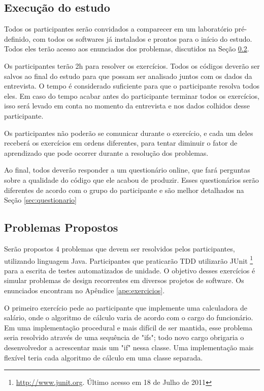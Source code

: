 \subsection{Execução do estudo}
\label{sec:execucao}	

Todos os participantes serão convidados a comparecer em um laboratório pré-definido,
com todos os softwares já instalados e prontos para o início do estudo. Todos eles
terão acesso aos enunciados dos problemas, discutidos na
Seção \ref{sec:exercicios}.

Os participantes terão 2h para resolver os exercícios. 
Todos os códigos deverão ser salvos ao final do estudo para que possam ser analisado juntos
com os dados da entrevista.
O tempo é considerado suficiente
para que o participante resolva todos eles. Em caso do tempo acabar antes do participante
terminar todos os exercícios, isso será levado em conta no momento da entrevista e nos
dados colhidos desse participante.

Os participantes não poderão se comunicar durante o exercício, e cada um deles receberá
os exercícios em ordens diferentes, para tentar diminuir o fator de aprendizado que 
pode ocorrer durante a resolução dos problemas.

Ao final, todos deverão responder a um questionário online, que fará perguntas sobre a qualidade
do código que ele acabou de produzir. Esses questionários serão diferentes de acordo com o 
grupo do participante e são melhor detalhados na Seção \ref{sec:questionario}

\subsection{Problemas Propostos}
\label{sec:exercicios}

Serão propostos 4 problemas que devem ser resolvidos pelos participantes, utilizando
linguagem Java. Participantes que praticarão TDD utilizarão JUnit \footnote{\url{http://www.junit.org}. 
Último acesso em 18 de Julho de 2011} para a escrita de testes
automatizados de unidade. O objetivo desses exercícios é simular problemas de design 
recorrentes em diversos projetos de software. Os enunciados encontram no Apêndice 
\ref{ape:exercicios}.

O primeiro exercício pede ao participante que implemente uma calculadora de salário, onde
o algoritmo de cálculo varia de acordo com o cargo do funcionário. Em uma implementação
procedural e mais difícil de ser mantida, esse problema seria resolvido através de uma
sequência de "ifs"; todo novo cargo obrigaria o desenvolvedor a acrescentar mais um "if" 
nessa classe. Uma implementação mais flexível teria cada algoritmo de cálculo em uma 
classe separada.

